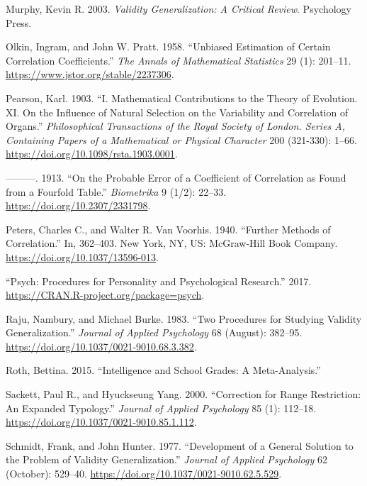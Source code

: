 \documentclass[
  letterpaper,
  DIV=11,
  numbers=noendperiod]{scrreprt}
\newlength{\cslhangindent}
\newlength{\cslentryspacingunit} %
\newenvironment{CSLReferences}[2] %
 {%
  \setlength{\parindent}{0pt}
  \ifodd #1
  \let\oldpar\par
  \def\par{\hangindent=\cslhangindent\oldpar}
  \fi
  \setlength{\parskip}{#2\cslentryspacingunit}
 }%
 {}
\begin{document}
\begin{CSLReferences}{1}{0}
\leavevmode{}%
Murphy, Kevin R. 2003. \emph{Validity Generalization: A Critical
Review}. Psychology Press.

\leavevmode{}%
Olkin, Ingram, and John W. Pratt. 1958. {``Unbiased Estimation of
Certain Correlation Coefficients.''} \emph{The Annals of Mathematical
Statistics} 29 (1): 201--11. \url{https://www.jstor.org/stable/2237306}.

\leavevmode{}%
Pearson, Karl. 1903. {``I. Mathematical Contributions to the Theory of
Evolution. {\textemdash}XI. On the Influence of Natural Selection on the
Variability and Correlation of Organs.''} \emph{Philosophical
Transactions of the Royal Society of London. Series A, Containing Papers
of a Mathematical or Physical Character} 200 (321-330): 1--66.
\url{https://doi.org/10.1098/rsta.1903.0001}.

\leavevmode{}%
---------. 1913. {``On the Probable Error of a Coefficient of
Correlation as Found from a Fourfold Table.''} \emph{Biometrika} 9
(1/2): 22--33. \url{https://doi.org/10.2307/2331798}.

\leavevmode{}%
Peters, Charles C., and Walter R. Van Voorhis. 1940. {``Further Methods
of Correlation.''} In, 362--403. New York, NY, US: McGraw-Hill Book
Company. \url{https://doi.org/10.1037/13596-013}.

\leavevmode{}%
{``Psych: Procedures for Personality and Psychological Research.''}
2017. \url{https://CRAN.R-project.org/package=psych}.

\leavevmode{}%
Raju, Nambury, and Michael Burke. 1983. {``Two Procedures for Studying
Validity Generalization.''} \emph{Journal of Applied Psychology} 68
(August): 382--95. \url{https://doi.org/10.1037/0021-9010.68.3.382}.

\leavevmode{}%
Roth, Bettina. 2015. {``Intelligence and School Grades: A
Meta-Analysis.''}

\leavevmode{}%
Sackett, Paul R., and Hyuckseung Yang. 2000. {``Correction for Range
Restriction: An Expanded Typology.''} \emph{Journal of Applied
Psychology} 85 (1): 112--18.
\url{https://doi.org/10.1037/0021-9010.85.1.112}.

\leavevmode{}%
Schmidt, Frank, and John Hunter. 1977. {``Development of a General
Solution to the Problem of Validity Generalization.''} \emph{Journal of
Applied Psychology} 62 (October): 529--40.
\url{https://doi.org/10.1037/0021-9010.62.5.529}.


\end{CSLReferences}
\end{document}
